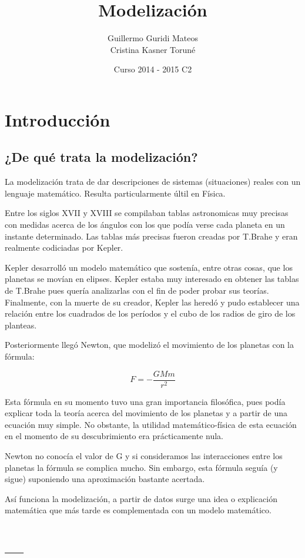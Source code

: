 \documentclass{apuntes}
\title{Modelización}
\author{Guillermo Guridi Mateos\\Cristina Kasner Toruné}
\date{Curso 2014 - 2015 C2}
\begin{document}
\pagestyle{plain}
\maketitle

\tableofcontents
\newpage

\chapter{Introducción}

\section{¿De qué trata la modelización?}

La modelización trata de dar descripciones de sistemas (situaciones) reales con un lenguaje matemático. Resulta particularmente últil en Física.

Entre los siglos XVII y XVIII se compilaban tablas astronomicas muy precisas con medidas acerca de los ángulos con los que podía verse cada planeta en un instante determinado. Las tablas más precisas fueron creadas por T.Brahe y eran realmente codiciadas por Kepler.

Kepler desarrolló un modelo matemático que sostenía, entre otras cosas, que los planetas se movían en elipses. Kepler estaba muy interesado en obtener las tablas de T.Brahe pues quería analizarlas con el fin de poder probar sus teorías. Finalmente, con la muerte de su creador, Kepler las heredó y pudo establecer una relación entre los cuadrados de los períodos y el cubo de los radios de giro de los planteas.

Posteriormente llegó Newton, que modelizó el movimiento de los planetas con la fórmula:

$$F = - \frac{GMm}{r^2}$$

Esta fórmula en su momento tuvo una gran importancia filosófica, pues podía explicar toda la teoría acerca del movimiento de los planetas y a partir de una ecuación muy simple. No obstante, la utilidad matemático-física de esta ecuación en el momento de su descubrimiento era prácticamente nula.

Newton no conocía el valor de G y si consideramos las interacciones entre los planetas la fórmula se complica mucho. Sin embargo, esta fórmula seguía (y sigue) suponiendo una aproximación bastante acertada.

Así funciona la modelización, a partir de datos surge una idea o explicación matemática que más tarde es complementada con un modelo matemático.




\appendix

\chapter{---}

\printindex
\end{document}
